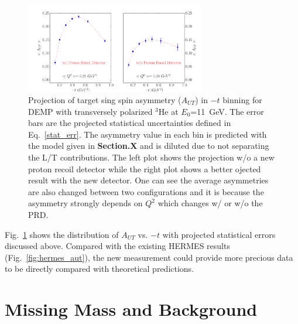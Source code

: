 \begin{figure}[!ht]
 \begin{center}
      \includegraphics[type=pdf,
        ext=.pdf,read=.pdf,width=0.7\textwidth]{./figures/bin_asym_t}
      \caption{\footnotesize{Projection of target sing spin asymmetry
          ($A_{UT}$) in $-t$ binning for DEMP with transversely polarized
          $\mathrm{^{3}He}$ at $E_{0}$=11~GeV. The error bars are the projected
          statistical uncertainties defined in Eq.~\ref{stat_err}. The
          asymmetry value in each bin is predicted with the model given in {\bf
            Section.X} and is diluted due to not separating the L/T
          contributions. The left plot shows the projection w/o a new proton
          recoil detector while the right plot shows a better ojected result
          with the new detector. One can see the average asymmetries are also
          changed between two configurations and it is because the asymmetry
          strongly depends on $Q^{2}$ which changes w/ or w/o the PRD.}}
  \label{asym_t}
  \end{center}
\end{figure}
Fig.~\ref{asym_t} shows the distribution of $A_{UT}$ vs. $-t$ with projected
statistical errors discussed above. Compared with the existing HERMES results
(Fig.~\ref{fig:hermes_aut}), the new measurement could provide more precious
data to be directly compared with theoretical predictions.

\section{Missing Mass and Background}

